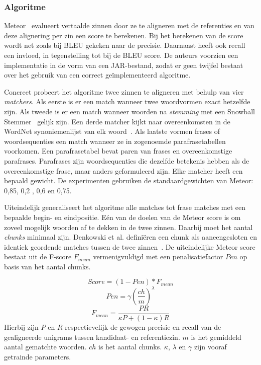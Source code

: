 \subsubsection{Algoritme}
Meteor~\cite{Denkowski2007a} evalueert vertaalde zinnen door ze te aligneren met de referenties en van deze alignering per zin een score te berekenen. Bij het berekenen van de score wordt net zoals bij BLEU gekeken naar de precisie. Daarnaast heeft ook recall een invloed, in tegenstelling tot bij de BLEU score. De auteurs voorzien een implementatie in de vorm van een JAR-bestand, zodat er geen twijfel bestaat over het gebruik van een correct ge\"implementeerd algoritme.

Concreet probeert het algoritme twee zinnen te aligneren met behulp van vier \emph{matchers}. Als eerste is er een match wanneer twee woordvormen exact hetzelfde zijn. Als tweede is er een match wanneer woorden na \emph{stemming} met een Snowball Stemmer~\cite{porter2001snowball} gelijk zijn. Een derde matcher kijkt naar overeenkomsten in de WordNet synoniemenlijst van elk woord~\cite{Miller1990}. Als laatste vormen frases of woordsequenties een match wanneer ze in zogenoemde parafrasetabellen voorkomen. Een parafrasetabel bevat paren van frases en overeenkomstige parafrases. Parafrases zijn woordsequenties die dezelfde betekenis hebben als de overeenkomstige frase, maar anders geformuleerd zijn.
Elke matcher heeft een bepaald gewicht. De experimenten gebruiken de standaardgewichten van Meteor: 0,85, 0,2 , 0,6 en 0,75.

Uiteindelijk generaliseert het algoritme alle matches tot frase matches met een bepaalde begin- en eindpositie. E\'en van de doelen van de Meteor score is om zoveel mogelijk woorden af te dekken in de twee zinnen. Daarbij moet het aantal \textit{chunks} minimaal zijn. Denkowski et al. defini\"eren een chunk als aaneengesloten en identiek geordende matches tussen de twee zinnen~\cite{Denkowski2007a}. De uiteindelijke Meteor score bestaat uit de F-score $F_{mean}$ vermenigvuldigd met een penalisatiefactor $Pen$ op basis van het aantal chunks.


\begin{equation}
Score = (1 - Pen)*F_{mean}
\end{equation} 
\begin{equation}
Pen = \gamma (\frac{ch}{m})^\lambda 
\end{equation}
\begin{equation}
F_{mean} = \frac{PR}{\kappa P + (1- \kappa)R}
\end{equation}
Hierbij zijn $P$ en $R$ respectievelijk de gewogen precisie en recall van de gealigneerde unigrams tussen kandidaat- en referentiezin. $m$ is het gemiddeld aantal gematchte woorden. $ch$ is het aantal chunks. $\kappa$, $\lambda$ en $\gamma$ zijn vooraf getrainde parameters.

